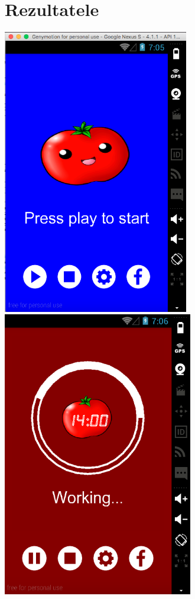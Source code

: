 \documentclass[12pt]{article}
\begin{document}
\section {Rezultatele}
\includegraphics[height=12.5cm]{images/6}
\includegraphics[height=12.5cm]{images/7}\\
\end{document}
